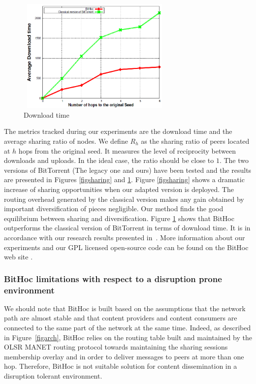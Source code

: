 \begin{figure}[!h]
  \begin{center}
    \includegraphics[width=3in,height=2.2in]{Chapitre2/downloadtime.png}
  \end{center}
  \caption{Download time}
  \label{FigDownloadtime}
\end{figure}

The metrics tracked during our experiments are the download time and the average sharing ratio of nodes. We define $R_{h}$ as the sharing ratio of peers located at $h$ hops from the original seed. It measures the level of reciprocity between downloads and uploads. In the ideal case, the ratio should be close to $1$. The two versions of BitTorrent (The legacy one and ours) have been tested and the results are presented in Figures \ref{figsharing} and \ref{FigDownloadtime}. Figure \ref{figsharing} shows a dramatic increase of sharing opportunities when our adapted version is deployed. The routing overhead generated by the classical version makes any gain obtained by important diversification of pieces negligible. Our method finds the good equilibrium between sharing and diversification. Figure \ref{FigDownloadtime} shows that BitHoc outperforms the classical version of BitTorrent in terms of download time. It is in accordance with our research results presented in~\cite{BitHocWeb}. More information about our experiments and our GPL licensed open-source code can be found on the BitHoc web site \cite{BitHocWeb}.

\subsubsection{BitHoc limitations with respect to a disruption prone environment}
\label{BitHoc:limitations}

We should note that BitHoc is built based on the assumptions that the network path are almost stable and that content providers and content consumers are connected to the same part of the network at the same time. Indeed, as described in Figure~\ref{figarch}, BitHoc relies on the routing table built and maintained by the OLSR MANET routing protocol towards maintaining the sharing sessions membership overlay and in order to deliver messages to peers at more than one hop. Therefore, BitHoc is not suitable solution for content dissemination in a disruption tolerant environment. 

